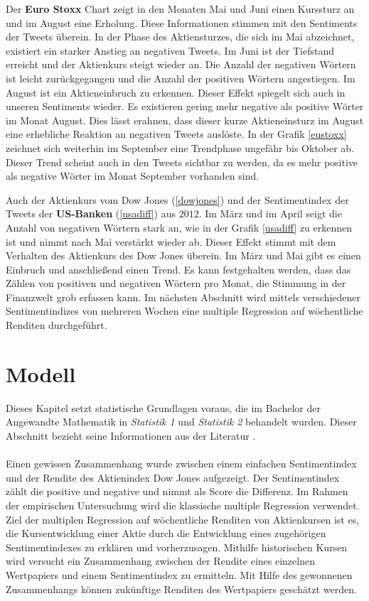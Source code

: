 Der \textbf{Euro Stoxx} Chart zeigt in den Monaten Mai und Juni einen Kurssturz an und im August eine Erholung. Diese Informationen stimmen mit den Sentiments der Tweets überein. In der Phase des Aktiensturzes, die sich im Mai abzeichnet, existiert ein starker Anstieg an negativen Tweets. Im Juni ist der Tiefstand erreicht und der Aktienkurs steigt wieder an. Die Anzahl der negativen Wörtern ist leicht zurückgegangen und die Anzahl der positiven Wörtern angestiegen. Im August ist ein Aktieneinbruch zu erkennen. Dieser Effekt spiegelt sich auch in unseren Sentiments wieder. Es existieren gering mehr negative als positive Wörter im Monat August. Dies lässt erahnen, dass dieser kurze Aktieneinsturz im August eine erhebliche Reaktion an negativen Tweets auslöste. In der Grafik \ref{eustoxx} zeichnet sich weiterhin im September eine Trendphase ungefähr bis Oktober ab. Dieser Trend scheint auch in den Tweets sichtbar zu werden, da es mehr positive als negative Wörter im Monat September vorhanden sind. 

Auch der Aktienkurs vom Dow Jones (\ref{dowjones}) und der Sentimentindex der Tweets der \textbf{US-Banken} (\ref{usadiff}) aus $2012$. Im März und im April seigt die Anzahl von negativen Wörtern stark an, wie in der Grafik \ref{usadiff} zu erkennen ist und nimmt nach Mai verstärkt wieder ab. Dieser Effekt stimmt mit dem Verhalten des Aktienkurs des Dow Jones überein. Im März und Mai gibt es einen Einbruch und anschließend einen Trend. Es kann festgehalten werden, dass das Zählen von positiven und negativen Wörtern pro Monat, die Stimmung in der Finanzwelt grob erfassen kann. Im nächsten Abschnitt wird mittels verschiedener Sentimentindizes von mehreren Wochen eine multiple Regression auf wöchentliche Renditen durchgeführt.

\section{Modell}\label{Modell}
Dieses Kapitel setzt statistische Grundlagen voraus, die im Bachelor der Angewandte Mathematik in \textit{Statistik 1} und \textit{Statistik 2} behandelt wurden. Dieser Abschnitt bezieht seine Informationen aus der Literatur \cite{becker}. \\
\\
Einen gewissen Zusammenhang wurde zwischen einem einfachen Sentimentindex und der Rendite des Aktienindex  Dow Jones aufgezeigt. Der Sentimentindex zählt die positive und negative und nimmt als Score die Differenz. Im Rahmen der empirischen Untersuchung wird die klassische multiple Regression verwendet. Ziel der multiplen Regression auf wöchentliche Renditen von Aktienkursen ist es, die Kursentwicklung einer Aktie durch die Entwicklung eines zugehörigen Sentimentindexes zu erklären und vorherzusagen. Mithilfe historischen Kursen wird versucht ein Zusammenhang zwischen der Rendite eines einzelnen Wertpapiers und einem Sentimentindex zu ermitteln. Mit Hilfe des gewonnenen Zusammenhangs können zukünftige Renditen des Wertpapiers geschätzt werden. \\


